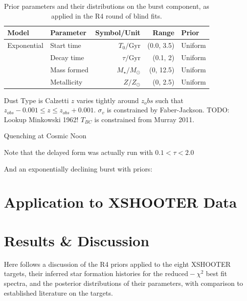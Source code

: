 \documentclass[a4paper,11pt]{article}
\begin{document}
\begin{table}
  \centering
  \begin{tabular}{l l r r l}
    Model       & Parameter   & Symbol/Unit         & Range      & Prior   \\
    \hline \hline
    Exponential & Start time  & $T_0/\mathrm{Gyr}$  & (0.0, 3.5) & Uniform \\ %
                & Decay time  & $\tau/\mathrm{Gyr}$ & (0.1, 2)   & Uniform \\
                & Mass formed & $M_\star/M_\odot$   & (0, 12.5)  & Uniform \\
                & Metallicity & $Z/Z_\odot$         & (0, 2.5)   & Uniform \\
  \end{tabular}
  \caption{Prior parameters and their distributions on the burst component, as applied in the R4 round of blind fits.}
  \label{tab:r4_burst_priors}
\end{table}

Dust Type is Calzetti
$z$ varies tightly around $z_obs$ such that $z_{obs}-0.001 \leq z \leq z_{obs}+0.001$.
$\sigma_{v}$ is constrained by Faber-Jackson. TODO: Lookup Minkowski 1962!
$T_{BC}$ is constrained from Murray 2011.

Quenching at Cosmic Noon

Note that the delayed form was actually run with   $0.1 < \tau < 2.0$

And an exponentially declining burst with priors:

\section{Application to XSHOOTER Data}\label{sec:tde_fitting}
\section{Results \& Discussion}\label{sec:results_and_discussion}

Here follows a discussion of the R4 priors applied to the eight XSHOOTER targets, their inferred star formation histories for the $\mathrm{reduced-}\chi^2$ best fit spectra, and the posterior distributions of their parameters, with comparison to established literature on the targets.
\end{document}
